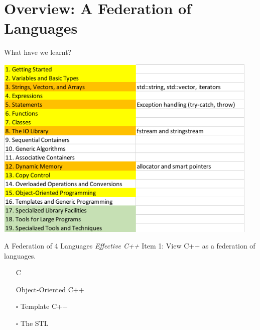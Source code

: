 \section{Overview: A Federation of Languages}

\begin{frame}{What have we learnt?}
    \begin{center}
        \includegraphics[width=0.95\textwidth]{figures/contents.png}
    \end{center}
\end{frame}

\begin{frame}{A Federation of 4 Languages}
    \textit{Effective C++} Item 1: View C++ as a federation of languages.
    \begin{itemize}
        \item[\done] C
        \item[\done] Object-Oriented C++
        \item[\(\square\)] Template C++
        \item[\(\square\)] The STL
    \end{itemize}
\end{frame}